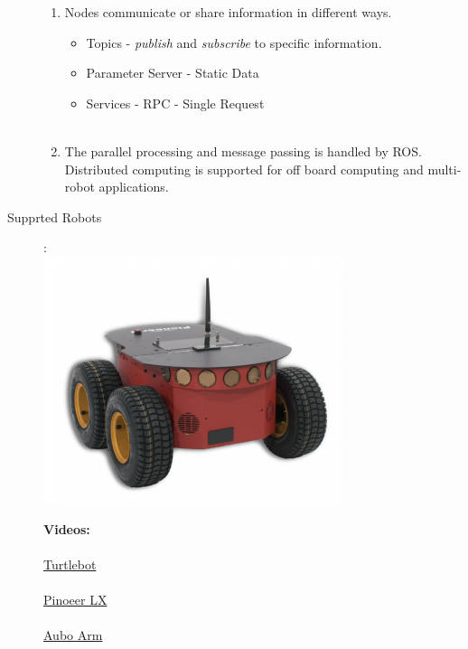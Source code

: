 \documentclass[12pt]{article}
\begin{document}
\begin{description}
\begin{enumerate}
                \item Nodes communicate or share information in  different ways. 
                 \begin{itemize}
                        \item Topics - {\it publish} and {\it subscribe} to specific information.
                        \item Parameter Server - Static Data
                        \item Services - RPC - Single Request \\\\
                    \end{itemize} 
                
                \item The parallel processing and message passing is handled by ROS. Distributed computing is supported for off board computing and multi-robot applications.
            \end{enumerate}    
         
         \newpage
         \item [Supprted Robots]:\\
                \includegraphics[scale=1]{p3at.PNG}
            

                
            \newpage
            \textbf{ Videos:} \\\\
       \href{https://youtu.be/wXPLH_2IRVw}{Turtlebot}\\\\
                \href{https://www.dropbox.com/s/adpg9v3lvfltd92/lx_demo_cut_07_07_2020.mp4?dl=0}{Pinoeer LX}\\\\

                \href{https://youtu.be/lcICvz5jMHw}{Aubo Arm}\\


\end{description}
\end{document}
